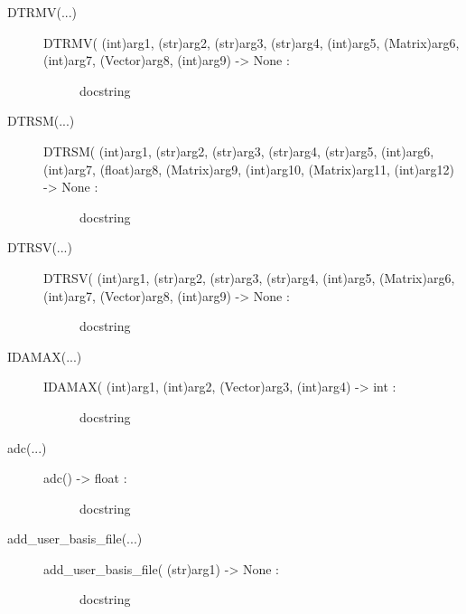 \documentclass[letterpaper,10pt,english]{sphinxmanual}
\begin{document}
\begin{description}
\begin{description}
\item[{DTRMV(...)}] \leavevmode\begin{description}
\item[{DTRMV( (int)arg1, (str)arg2, (str)arg3, (str)arg4, (int)arg5, (Matrix)arg6, (int)arg7, (Vector)arg8, (int)arg9) -\textgreater{} None :}] \leavevmode
docstring

\end{description}

\item[{DTRSM(...)}] \leavevmode\begin{description}
\item[{DTRSM( (int)arg1, (str)arg2, (str)arg3, (str)arg4, (str)arg5, (int)arg6, (int)arg7, (float)arg8, (Matrix)arg9, (int)arg10, (Matrix)arg11, (int)arg12) -\textgreater{} None :}] \leavevmode
docstring

\end{description}

\item[{DTRSV(...)}] \leavevmode\begin{description}
\item[{DTRSV( (int)arg1, (str)arg2, (str)arg3, (str)arg4, (int)arg5, (Matrix)arg6, (int)arg7, (Vector)arg8, (int)arg9) -\textgreater{} None :}] \leavevmode
docstring

\end{description}

\item[{IDAMAX(...)}] \leavevmode\begin{description}
\item[{IDAMAX( (int)arg1, (int)arg2, (Vector)arg3, (int)arg4) -\textgreater{} int :}] \leavevmode
docstring

\end{description}

\item[{adc(...)}] \leavevmode\begin{description}
\item[{adc() -\textgreater{} float :}] \leavevmode
docstring

\end{description}

\item[{add\_user\_basis\_file(...)}] \leavevmode\begin{description}
\item[{add\_user\_basis\_file( (str)arg1) -\textgreater{} None :}] \leavevmode
docstring

\end{description}


\end{description}
\end{description}
\end{document}

